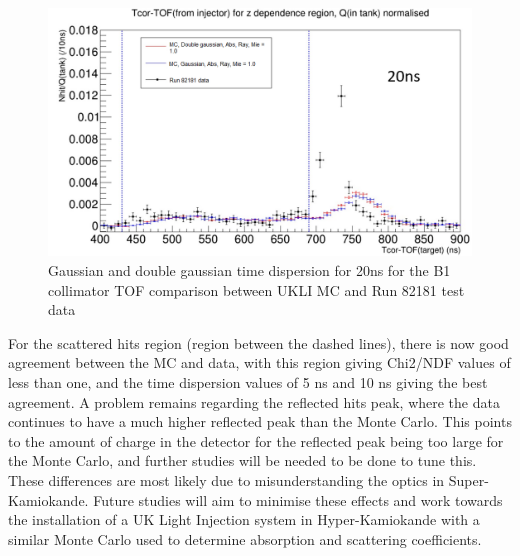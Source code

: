 \begin{figure}
    \centering
    \includegraphics[width=\textwidth]{Figures/time_dispersion_TOF_20ns.PNG}
    \caption{Gaussian and double gaussian time dispersion for 20ns for the B1 collimator TOF comparison between UKLI MC and Run 82181 test data}
    \label{fig:20ns_time_dispersion}
\end{figure}


For the scattered hits region (region between the dashed lines), there is now good agreement between the MC and data, with this region giving Chi2/NDF values of less than one, and the time dispersion values of 5 ns and 10 ns giving the best agreement. A problem remains regarding the reflected hits peak, where the data continues to have a much higher reflected peak than the Monte Carlo. This points to the amount of charge in the detector for the reflected peak being too large for the Monte Carlo, and further studies will be needed to be done to tune this. These differences are most likely due to misunderstanding the optics in Super-Kamiokande. Future studies will aim to minimise these effects and work towards the installation of a UK Light Injection system in Hyper-Kamiokande with a similar Monte Carlo used to determine absorption and scattering coefficients. 


